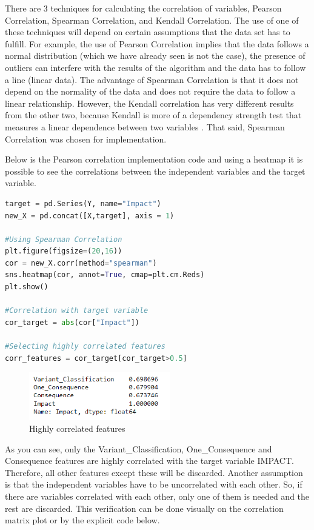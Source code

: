 There are 3 techniques for calculating the correlation of variables, Pearson Correlation, Spearman Correlation, and Kendall Correlation. The use of one of these techniques will depend on certain assumptions that the data set has to fulfill. For example, the use of Pearson Correlation implies that the data follows a normal distribution (which we have already seen is not the case), the presence of outliers can interfere with the results of the algorithm and the data has to follow a line (linear data). The advantage of Spearman Correlation is that it does not depend on the normality of the data and does not require the data to follow a linear relationship. However, the Kendall correlation has very different results from the other two, because Kendall is more of a dependency strength test that measures a linear dependence between two variables \cite{Hall}. That said, Spearman Correlation was chosen for implementation.

Below is the Pearson correlation implementation code and using a heatmap it is possible to see the correlations between the independent variables and the target variable.

\begin{lstlisting}[language=Python]
target = pd.Series(Y, name="Impact")
new_X = pd.concat([X,target], axis = 1)

#Using Spearman Correlation
plt.figure(figsize=(20,16))
cor = new_X.corr(method="spearman")
sns.heatmap(cor, annot=True, cmap=plt.cm.Reds)
plt.show()

#Correlation with target variable
cor_target = abs(cor["Impact"])

#Selecting highly correlated features
corr_features = cor_target[cor_target>0.5]
\end{lstlisting}

\begin{figure}[h]
    \centering
    \includegraphics[width=0.55\textwidth,height=0.1\textheight]{Chapters/Figures/cfs.png}
    \caption{Highly correlated features}
    \label{fig:lda_graph}
\end{figure}

As you can see, only the Variant\_Classification, One\_Consequence and Consequence features are highly correlated with the target variable IMPACT. Therefore, all other features except these will be discarded. Another assumption is that the independent variables have to be uncorrelated with each other. So, if there are variables correlated with each other, only one of them is needed and the rest are discarded. This verification can be done visually on the correlation matrix plot or by the explicit code below.

